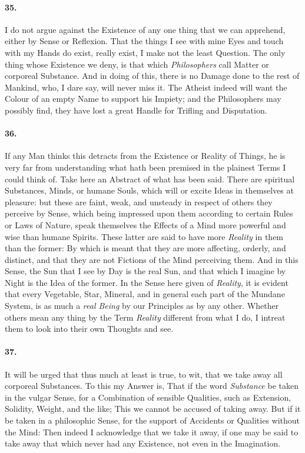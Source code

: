 \documentclass[]{article}
\newenvironment{sectionbody}{\begin{multicols}{2}}{\end{multicols}}
\begin{document}
\begin{sectionbody}
\paragraph{35.} I do not argue against the Existence of any one thing that we can
apprehend, either by Sense or Reflexion.  That the things I see
with mine Eyes and touch with my Hands do exist, really exist, I
make not the least Question.  The only thing whose Existence we
deny, is that which \emph{Philosophers} call Matter or
corporeal Substance.  And in doing of this, there is no Damage
done to the rest of Mankind, who, I dare say, will never miss it.
The Atheist indeed will want the Colour of an empty Name to
support his Impiety; and the Philosophers may possibly find, they
have lost a great Handle for Trifling and Disputation.



\paragraph{36.} If any Man thinks this detracts from the Existence or Reality of
Things, he is very far from understanding what hath been premised
in the plainest Terms I could think of.  Take here an Abstract of
what has been said.  There are spiritual Substances, Minds, or
humane Souls, which will or excite Ideas in themselves at
pleasure: but these are faint, weak, and unsteady in respect of
others they perceive by Sense,  which being impressed upon them
according to certain Rules or Laws of Nature, speak themselves
the Effects of a Mind more powerful and wise than humane Spirits.
These latter are said to have more \emph{Reality} in them than
the former: By which is meant that they are more affecting,
orderly, and distinct, and that they are not Fictions of the Mind
perceiving them.  And in this Sense, the Sun that I see by Day is
the real Sun, and that which I imagine by Night is the Idea of
the former.  In the Sense here given of \emph{Reality}, it is
evident that every Vegetable, Star, Mineral, and in general each
part of the Mundane System, is as much a \emph{real Being} by
our Principles as by any other.  Whether others mean any thing by
the Term \emph{Reality} different from what I do, I intreat
them to look into their own Thoughts and see.



\paragraph{37.} It will be urged that thus much at least is true, to wit, that we
take away all corporeal Substances.  To this my Answer is, That
if the word \emph{Substance} be taken in the vulgar Sense, for
a Combination of sensible Qualities, such as Extension, Solidity,
Weight, and the like; This we cannot be accused of taking away.
But if it be taken in a philosophic Sense, for the support of
Accidents or Qualities without the Mind: Then indeed I
acknowledge that we take it away, if one may be said to take away
that which never had any Existence, not even in the Imagination.




\end{sectionbody}
\end{document}
